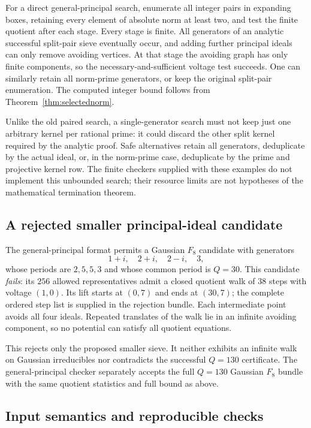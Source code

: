 \documentclass[11pt]{article}
\numberwithin{equation}{section}
\theoremstyle{definition}\newtheorem{definition}[theorem]{Definition}
\theoremstyle{remark}\newtheorem{remark}[theorem]{Remark}
\begin{document}
For a direct general-principal search, enumerate all integer pairs in expanding boxes, retaining every element of absolute norm at least two, and test the finite quotient after each stage. Every stage is finite. All generators of an analytic successful split-pair sieve eventually occur, and adding further principal ideals can only remove avoiding vertices. At that stage the avoiding graph has only finite components, so the necessary-and-sufficient voltage test succeeds. One can similarly retain all norm-prime generators, or keep the original split-pair enumeration. The computed integer bound follows from Theorem~\ref{thm:selectednorm}.

Unlike the old paired search, a single-generator search must not keep just one arbitrary kernel per rational prime: it could discard the other split kernel required by the analytic proof. Safe alternatives retain all generators, deduplicate by the actual ideal, or, in the norm-prime case, deduplicate by the prime and projective kernel row. The finite checkers supplied with these examples do not implement this unbounded search; their resource limits are not hypotheses of the mathematical termination theorem.

\subsection{A rejected smaller principal-ideal candidate}\label{sec:rejected}

The general-principal format permits a Gaussian $F_8$ candidate with generators
\[
 1+i,\quad2+i,\quad2-i,\quad3,
\]
whose periods are $2,5,5,3$ and whose common period is $Q=30$. This candidate \emph{fails}: its $256$ allowed representatives admit a closed quotient walk of $38$ steps with voltage $(1,0)$. Its lift starts at $(0,7)$ and ends at $(30,7)$; the complete ordered step list is supplied in the rejection bundle. Each intermediate point avoids all four ideals. Repeated translates of the walk lie in an infinite avoiding component, so no potential can satisfy all quotient equations.

This rejects only the proposed smaller sieve. It neither exhibits an infinite walk on Gaussian irreducibles nor contradicts the successful $Q=130$ certificate. The general-principal checker separately accepts the full $Q=130$ Gaussian $F_8$ bundle with the same quotient statistics and full bound as above.

\subsection{Input semantics and reproducible checks}
\end{document}
